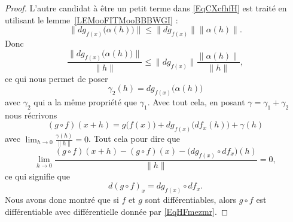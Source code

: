 \begin{proof}
    L'autre candidat à être un petit terme dans \eqref{EqCXcfhfH} est traité en utilisant le lemme~\ref{LEMooFITMooBBBWGI} :
    \begin{equation}
        \| dg_{f(x)}\big( \alpha(h) \big) \|\leq \| dg_{f(x)} \|\| \alpha(h) \|.
    \end{equation}
    Donc
    \begin{equation}
        \frac{ \| dg_{f(x)}\big( \alpha(h) \big) \| }{ \| h \| }\leq \| dg_{f(x)} \|\frac{ \| \alpha(h) \| }{ \| h \| },
    \end{equation}
    ce qui nous permet de poser
    \begin{equation}
        \gamma_2(h)=dg_{f(x)}\big( \alpha(h) \big)
    \end{equation}
    avec \( \gamma_2\) qui a la même propriété que \( \gamma_1\). Avec tout cela, en posant \( \gamma=\gamma_1+\gamma_2\) nous récrivons
    \begin{equation}
        (g\circ f)(x+h)=g\big( f(x) \big)+dg_{f(x)}\big( df_x(h) \big)+\gamma(h)
    \end{equation}
    avec \( \lim_{h\to 0} \frac{ \gamma(h) }{ \| h \| }=0\). Tout cela pour dire que
    \begin{equation}
        \lim_{h\to 0} \frac{ (g\circ f)(x+h)-(g\circ f)(x)-\big( dg_{f(x)}\circ df_x \big)(h) }{ \| h \| }=0,
    \end{equation}
    ce qui signifie que
    \begin{equation}
        d(g\circ f)_x=dg_{f(x)}\circ df_x.
    \end{equation}
    Nous avons donc montré que si \( f\) et \( g\) sont différentiables, alors \( g\circ f\) est différentiable avec différentielle donnée par \eqref{EqHFmezmr}.


\end{proof}
